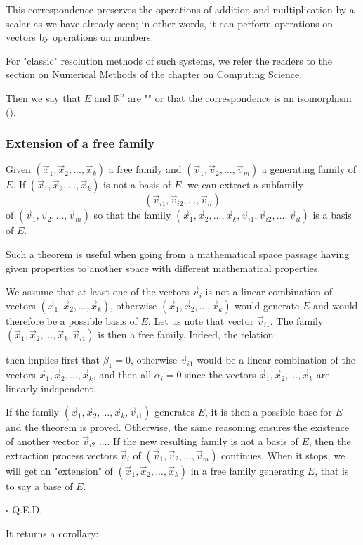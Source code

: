 	This correspondence preserves the operations of addition and multiplication by a scalar as we have already seen; in other words, it can perform operations on vectors by operations on numbers.
	
	\begin{tcolorbox}[title=Remark,colframe=black,arc=10pt]
For "classic" resolution methods of such systems, we refer the readers to the section on Numerical Methods of the chapter on Computing Science.
	\end{tcolorbox}	
	Then we say that $E$ and $\mathbb{R}^n$ are "" or that the correspondence is an isomorphism ().
	
	\subsubsection{Extension of a free family}
	\begin{theorem}
	Given $(\vec{x}_1,\vec{x}_2,...,\vec{x}_k)$ a free family and $(\vec{v}_1,\vec{v}_2,...,\vec{v}_m)$ a generating family of $E$. If $(\vec{x}_1,\vec{x}_2,...,\vec{x}_k)$ is not a basis of $E$, we can extract a subfamily $$(\vec{v}_{i1},\vec{v}_{i2},...,\vec{v}_{il})$$ of $(\vec{v}_1,\vec{v}_2,...,\vec{v}_m)$ so that the family $(\vec{x}_1,\vec{x}_2,...,\vec{x}_k,\vec{v}_{i1},\vec{v}_{i2},...,\vec{v}_{il})$ is a basis of $E$.
	\end{theorem}
	\begin{tcolorbox}[title=Remark,colframe=black,arc=10pt]
	Such a theorem is useful when going from a mathematical space passage having given properties to another space with different mathematical properties.
	\end{tcolorbox}	
	\begin{dem}
	We assume that at least one of the vectors $\vec{v}_i$ is not a linear combination of vectors $(\vec{x}_1,\vec{x}_2,...,\vec{x}_k)$, otherwise $(\vec{x}_1,\vec{x}_2,...,\vec{x}_k)$ would generate $E$ and would therefore be a possible basis of $E$. Let us note that vector $\vec{v}_{i1}$. The family $(\vec{x}_1,\vec{x}_2,...,\vec{x}_k,\vec{v}_{i1})$ is then a free family. Indeed, the relation:
	
	then implies first that $\beta_1=0$, otherwise $\vec{v}_{i1}$ would be a linear combination of the vectors $\vec{x}_1,\vec{x}_2,...,\vec{x}_k$, and then all $\alpha_i=0$ since the vectors $\vec{x}_1,\vec{x}_2,...,\vec{x}_k$ are linearly independent.
	
	If the family $(\vec{x}_1,\vec{x}_2,...,\vec{x}_k,\vec{v}_{i1})$ generates $E$, it is then a possible base for $E$ and the theorem is proved. Otherwise, the same reasoning ensures the existence of another vector $\vec{v}_{i2}$ .... If the new resulting family is not a basis of $E$, then the extraction process vectors $\vec{v}_i$ of $(\vec{v}_1,\vec{v}_2,...,\vec{v}_m)$ continues. When it stops, we will get an "extension" of $(\vec{x}_1,\vec{x}_2,...,\vec{x}_k)$ in a free family generating $E$, that is to say a base of $E$.
	\begin{flushright}
		$\square$  Q.E.D.
	\end{flushright}
	\end{dem}
	It returns a corollary: 

